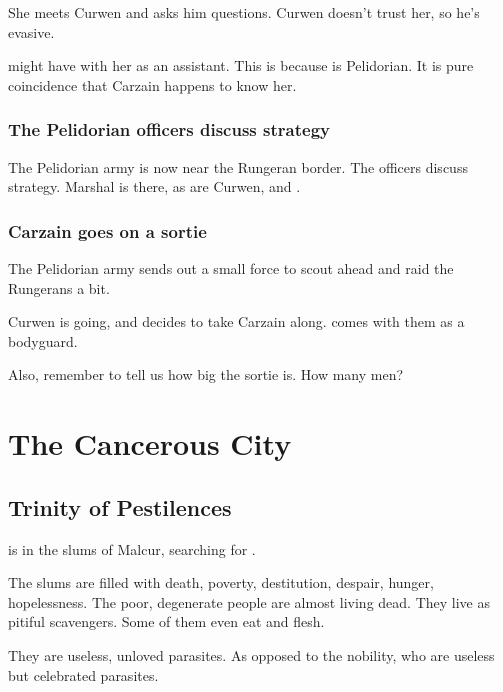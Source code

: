 \begin{garbage}
She meets Curwen and asks him questions. 
Curwen doesn't trust her, so he's evasive. 

\Esmerel{} might have \Racel{} with her as an assistant. 
This is because \Racel{} is Pelidorian.
It is pure coincidence that Carzain happens to know her. 





\subsubsection{The Pelidorian officers discuss strategy}
The Pelidorian army is now near the Rungeran border. 
The officers discuss strategy. 
Marshal  is there, as are Curwen, \Sanyor{} and \Dornaer. 





\subsubsection{Carzain goes on a sortie}
The Pelidorian army sends out a small force to scout ahead and raid the Rungerans a bit. 

Curwen is going, and decides to take Carzain along. 
 comes with them as a bodyguard. 

Also, remember to tell us how big the sortie is. How many men?







\section{The Cancerous City}







\subsection{Trinity of Pestilences}
 is in the slums of Malcur, searching for . 

The slums are filled with death, poverty, destitution, despair, hunger, hopelessness. The poor, degenerate people are almost living dead. They live as pitiful scavengers. Some of them even eat \human{} and \scathaese{} flesh. 

They are useless, unloved parasites. As opposed to the nobility, who are useless but celebrated parasites. 


\end{garbage}
